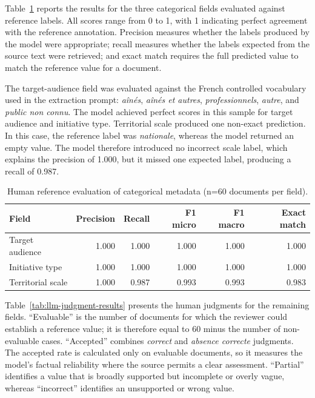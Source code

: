 \documentclass[
11pt,
english,
singlespacing,
headsepline,
]{MastersDoctoralThesis}
\begin{document}
Table~\ref{tab:llm-categorical-results} reports the results for the three
categorical fields evaluated against reference labels. All scores range from 0 to 1, with 1 indicating
perfect agreement with the reference annotation. Precision measures whether the
labels produced by the model were appropriate; recall measures whether the labels
expected from the source text were retrieved; and exact match requires the full
predicted value to match the reference value for a document.

The target-audience field was evaluated against the French controlled vocabulary
used in the extraction prompt: \textit{aînés}, \textit{aînés et autres},
\textit{professionnels}, \textit{autre}, and \textit{public non connu}. The model
achieved perfect scores in this sample for target audience and initiative type.
Territorial scale produced one non-exact prediction. In this case, the reference
label was \textit{nationale}, whereas the model returned an empty value. The model
therefore introduced no incorrect scale label, which explains the
precision of 1.000, but it missed one expected label, producing a recall of 0.987.

\begin{table}[H]
\centering
\begin{tabular}{lrrrrr}
\toprule
Field & Precision & Recall & F1 micro & F1 macro & Exact match \\
\midrule
Target audience & 1.000 & 1.000 & 1.000 & 1.000 & 1.000 \\
Initiative type & 1.000 & 1.000 & 1.000 & 1.000 & 1.000 \\
Territorial scale & 1.000 & 0.987 & 0.993 & 0.993 & 0.983 \\
\bottomrule
\end{tabular}
\caption{Human reference evaluation of categorical metadata
(n=60 documents per field).}
\label{tab:llm-categorical-results}
\end{table}

Table~\ref{tab:llm-judgment-results} presents the human judgments for the
remaining fields. ``Evaluable'' is the number of documents for which the reviewer
could establish a reference value; it is therefore equal to 60 minus the number of
non-evaluable cases. ``Accepted'' combines \textit{correct} and \textit{absence
correcte} judgments. The accepted rate is calculated only on evaluable documents,
so it measures the model's factual reliability where the source permits a clear
assessment. ``Partial'' identifies a value that is broadly supported but incomplete
or overly vague, whereas ``incorrect'' identifies an unsupported or wrong value.
\end{document}
